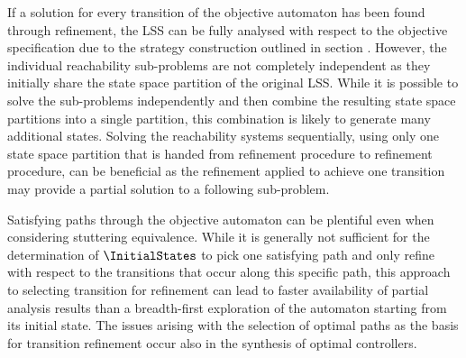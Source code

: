     If a solution for every transition of the objective automaton has been found through refinement, the LSS can be fully analysed with respect to the objective specification due to the strategy construction outlined in section .
    However, the individual reachability sub-problems are not completely independent as they initially share the state space partition of the original LSS.
    While it is possible to solve the sub-problems independently and then combine the resulting state space partitions into a single partition, this combination is likely to generate many additional states.
    Solving the reachability systems sequentially, using only one state space partition that is handed from refinement procedure to refinement procedure, can be beneficial as the refinement applied to achieve one transition may provide a partial solution to a following sub-problem.

    Satisfying paths through the objective automaton can be plentiful even when considering stuttering equivalence.
    While it is generally not sufficient for the determination of $\InitialStates$ to pick one satisfying path and only refine with respect to the transitions that occur along this specific path, this approach to selecting transition for refinement can lead to faster availability of partial analysis results than a breadth-first exploration of the automaton starting from its initial state.
    The issues arising with the selection of optimal paths as the basis for transition refinement occur also in the synthesis of optimal controllers.

\stopsubsection

